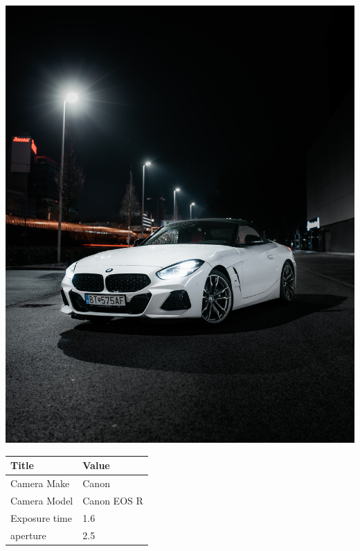 \documentclass[twocolumn]{article}
\begin{document}
\begin{center}
\includegraphics[width=0.7\columnwidth]{Image4}
\newline
\newline
\newline
\newline
\newline

\begin{tabular}{| m{3cm} | m{3cm} |}
\hline

Title  &  Value   \\

\hline
Camera Make  & Canon   \\
\hline
Camera Model  & Canon EOS R   \\
\hline
Exposure time  & 1.6  \\
\hline
aperture & 2.5 \\
\hline

\end{tabular}


\end{center}

\newpage
\end{document}

